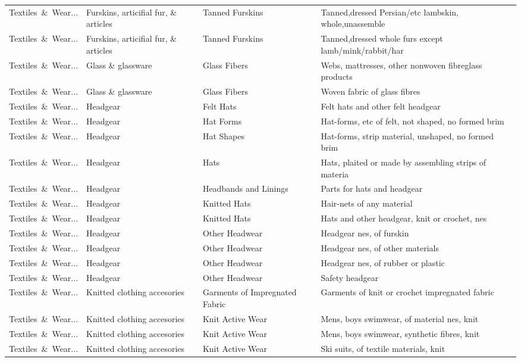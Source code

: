 \begin{appendices}
\begin{xltabular}{\textwidth}{|p{0.10\textwidth}|p{0.25\textwidth}|p{0.24\textwidth}|p{0.31\textwidth}|}
Textiles\ \&\ Wear... & Furskins, articifial fur, \& articles & Tanned Furskins & Tanned,dressed Persian/etc lambskin, whole,unassemble \\
Textiles\ \&\ Wear... & Furskins, articifial fur, \& articles & Tanned Furskins & Tanned,dressed whole furs except lamb/mink/rabbit/har \\
Textiles\ \&\ Wear... & Glass \& glassware & Glass Fibers & Webs, mattresses, other nonwoven fibreglass products \\
Textiles\ \&\ Wear... & Glass \& glassware & Glass Fibers & Woven fabric of glass fibres \\
Textiles\ \&\ Wear... & Headgear & Felt Hats & Felt hats and other felt headgear \\
Textiles\ \&\ Wear... & Headgear & Hat Forms & Hat-forms, etc of felt, not shaped, no formed brim \\
Textiles\ \&\ Wear... & Headgear & Hat Shapes & Hat-forms, strip material, unshaped, no formed brim \\
Textiles\ \&\ Wear... & Headgear & Hats & Hats, plaited or made by assembling strips of materia \\
Textiles\ \&\ Wear... & Headgear & Headbands and Linings & Parts for hats and headgear \\
Textiles\ \&\ Wear... & Headgear & Knitted Hats & Hair-nets of any material \\
Textiles\ \&\ Wear... & Headgear & Knitted Hats & Hats and other headgear, knit or crochet, nes \\
Textiles\ \&\ Wear... & Headgear & Other Headwear & Headgear nes, of furskin \\
Textiles\ \&\ Wear... & Headgear & Other Headwear & Headgear nes, of other materials \\
Textiles\ \&\ Wear... & Headgear & Other Headwear & Headgear nes, of rubber or plastic \\
Textiles\ \&\ Wear... & Headgear & Other Headwear & Safety headgear \\
Textiles\ \&\ Wear... & Knitted clothing accesories & Garments of Impregnated Fabric & Garments of knit or crochet impregnated fabric \\
Textiles\ \&\ Wear... & Knitted clothing accesories & Knit Active Wear & Mens, boys swimwear, of material nes, knit \\
Textiles\ \&\ Wear... & Knitted clothing accesories & Knit Active Wear & Mens, boys swimwear, synthetic fibres, knit \\
Textiles\ \&\ Wear... & Knitted clothing accesories & Knit Active Wear & Ski suits, of textile materials, knit \\

\end{xltabular}
\end{appendices}
